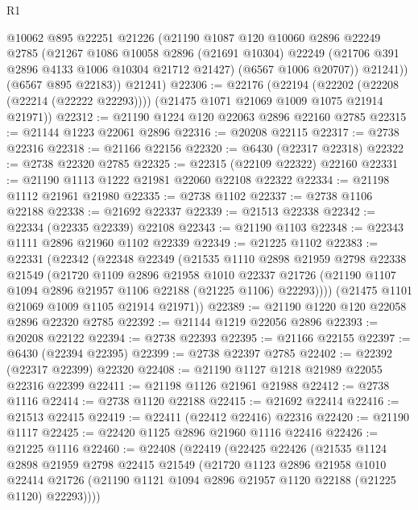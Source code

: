 \begin{lexlean}{R1}
\begin{coremodule}
          @10062
          @895
          @22251
          @21226
          (@21190
            @1087
            @120
            @10060
            @2896
            @22249
            @2785
            (@21267
              @1086
              @10058
              @2896
              (@21691 @10304)
              @22249
              (@21706 @391 @2896 @4133 @1006 @10304 @21712 @21427)
              (@6567 @1006 @20707))
            @21241))
        (@6567 @895 @22183))
      @21241)
@22306 := @22176
    (@22194
      (@22202 (@22208 (@22214 (@22222 @22293))))
      (@21475 @1071 @21069 @1009 @1075 @21914 @21971))
@22312 := @21190 @1224 @120 @22063 @2896 @22160 @2785
@22315 := @21144 @1223 @22061 @2896
@22316 := @20208 @22115
@22317 := @2738 @22316
@22318 := @21166 @22156
@22320 := @6430 (@22317 @22318)
@22322 := @2738 @22320 @2785
@22325 := @22315 (@22109 @22322) @22160
@22331 := @21190 @1113 @1222 @21981 @22060 @22108 @22322
@22334 := @21198 @1112 @21961 @21980
@22335 := @2738 @1102
@22337 := @2738 @1106 @22188
@22338 := @21692 @22337
@22339 := @21513 @22338
@22342 := @22334 (@22335 @22339) @22108
@22343 := @21190 @1103
@22348 := @22343 @1111 @2896 @21960 @1102 @22339
@22349 := @21225 @1102
@22383 := @22331
    (@22342
      (@22348
        @22349
        (@21535
          @1110
          @2898
          @21959
          @2798
          @22338
          @21549
          (@21720
            @1109
            @2896
            @21958
            @1010
            @22337
            @21726
            (@21190 @1107 @1094 @2896 @21957 @1106 @22188 (@21225 @1106) @22293))))
      (@21475 @1101 @21069 @1009 @1105 @21914 @21971))
@22389 := @21190 @1220 @120 @22058 @2896 @22320 @2785
@22392 := @21144 @1219 @22056 @2896
@22393 := @20208 @22122
@22394 := @2738 @22393
@22395 := @21166 @22155
@22397 := @6430 (@22394 @22395)
@22399 := @2738 @22397 @2785
@22402 := @22392 (@22317 @22399) @22320
@22408 := @21190 @1127 @1218 @21989 @22055 @22316 @22399
@22411 := @21198 @1126 @21961 @21988
@22412 := @2738 @1116
@22414 := @2738 @1120 @22188
@22415 := @21692 @22414
@22416 := @21513 @22415
@22419 := @22411 (@22412 @22416) @22316
@22420 := @21190 @1117
@22425 := @22420 @1125 @2896 @21960 @1116 @22416
@22426 := @21225 @1116
@22460 := @22408
    (@22419
      (@22425
        @22426
        (@21535
          @1124
          @2898
          @21959
          @2798
          @22415
          @21549
          (@21720
            @1123
            @2896
            @21958
            @1010
            @22414
            @21726
            (@21190 @1121 @1094 @2896 @21957 @1120 @22188 (@21225 @1120) @22293))))

\end{coremodule}
\end{lexlean}
